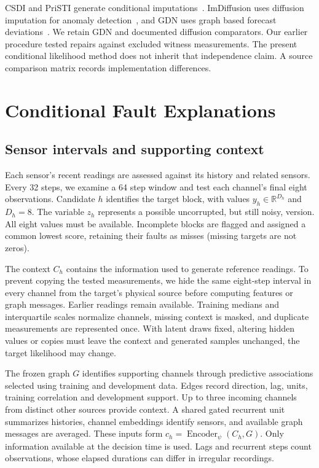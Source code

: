 \documentclass{llncs}
\newcommand{\1}{\mathbf{1}}
\begin{document}
CSDI and PriSTI generate conditional imputations~\cite{csdi,pristi}. ImDiffusion uses diffusion imputation for anomaly detection~\cite{imdiffusion}, and GDN uses graph based forecast deviations~\cite{gdn}. We retain GDN and documented diffusion comparators. Our earlier procedure tested repairs against excluded witness measurements. The present conditional likelihood method does not inherit that independence claim. A source comparison matrix records implementation differences.





\section{Conditional Fault Explanations}

\subsection{Sensor intervals and supporting context}
Each sensor's recent readings are assessed against its history and related sensors. Every 32 steps, we examine a 64 step window and test each channel's final eight observations. Candidate $h$ identifies the target block, with values $y_h\in\mathbb R^{D_h}$ and $D_h=8$. The variable $z_h$ represents a possible uncorrupted, but still noisy, version. All eight values must be available. Incomplete blocks are flagged and assigned a common lowest score, retaining their faults as misses (missing targets are not zeros).

The context $C_h$ contains the information used to generate reference readings. To prevent copying the tested measurements, we hide the same eight-step interval in every channel from the target's physical source before computing features or graph messages. Earlier readings remain available. Training medians and interquartile scales normalize channels, missing context is masked, and duplicate measurements are represented once. With latent draws fixed, altering hidden values or copies must leave the context and generated samples unchanged, the target likelihood may change.

The frozen graph $G$ identifies supporting channels through predictive associations selected using training and development data. Edges record direction, lag, units, training correlation and development support. Up to three incoming channels from distinct other sources provide context. A shared gated recurrent unit summarizes histories, channel embeddings identify sensors, and available graph messages are averaged. These inputs form $c_h=\operatorname{Encoder}_{\psi}(C_h,G)$. Only information available at the decision time is used. Lags and recurrent steps count observations, whose elapsed durations can differ in irregular recordings.
\end{document}

